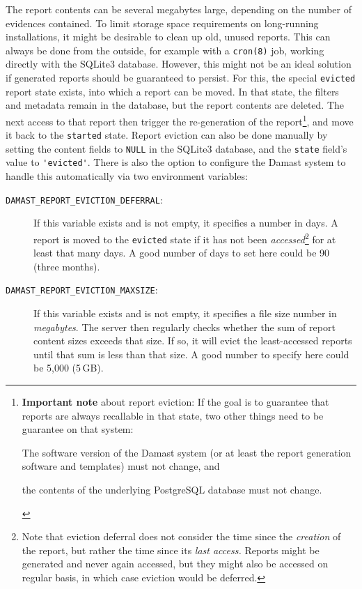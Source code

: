 The report contents can be several megabytes large, depending on the number of evidences contained.
To limit storage space requirements on long-running installations, it might be desirable to clean up old, unused reports.
This can always be done from the outside, for example with a \verb!cron(8)! job, working directly with the SQLite3 database.
However, this might not be an ideal solution if generated reports should be guaranteed to persist.
For this, the special \verb!evicted! report state exists, into which a report can be moved.
In that state, the filters and metadata remain in the database, but the report contents are deleted.
The next access to that report then trigger the re-generation of the report\footnote{%
  \textbf{Important note} about report eviction:
  If the goal is to guarantee that reports are always recallable in that state, two other things need to be guarantee on that system:
  \begin{enumerate*}[label=(\arabic*)]
    \item The software version of the Damast system (or at least the report generation software and templates) must not change, and
    \item the contents of the underlying PostgreSQL database must not change.
  \end{enumerate*}
}, and move it back to the \verb!started! state.
Report eviction can also be done manually by setting the content fields to \verb!NULL! in the SQLite3 database, and the \verb!state! field's value to \verb!'evicted'!.
There is also the option to configure the Damast system to handle this automatically via two environment variables:

\begin{description}
  \item[\texttt{DAMAST\_REPORT\_EVICTION\_DEFERRAL}:]
    If this variable exists and is not empty, it specifies a number in days.
    A report is moved to the \texttt{evicted} state if it has not been \emph{accessed}\footnote{%
      Note that eviction deferral does not consider the time since the \emph{creation} of the report, but rather the time since its \emph{last access.}
      Reports might be generated and never again accessed, but they might also be accessed on regular basis, in which case eviction would be deferred.
    } for at least that many days.
    A good number of days to set here could be 90 (three months).
  \item[\texttt{DAMAST\_REPORT\_EVICTION\_MAXSIZE}:]
    If this variable exists and is not empty, it specifies a file size number in \emph{megabytes}.
    The server then regularly checks whether the sum of report content sizes exceeds that size.
    If so, it will evict the least-accessed reports until that sum is less than that size.
    A good number to specify here could be 5,000 (5\,GB).
\end{description}


